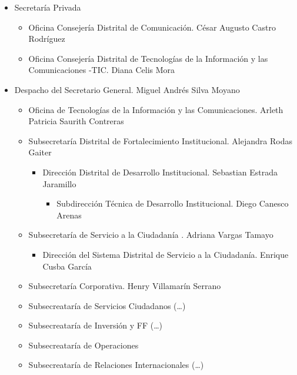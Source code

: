 \documentclass[
	a4paper, %
	12pt, %
]{include/CSSullivanBusinessReport}
\def\tightlist{}
\begin{document}
\begin{itemize}
\tightlist
\item
  Secretaría Privada

  \begin{itemize}
  \tightlist
  \item
    Oficina Consejería Distrital de Comunicación. César Augusto Castro
    Rodríguez
  \item
    Oficina Consejería Distrital de Tecnologías de la Información y las
    Comunicaciones -TIC. Diana Celis Mora
  \end{itemize}
\item
  Despacho del Secretario General. Miguel Andrés Silva Moyano

  \begin{itemize}
  \tightlist
  \item
    Oficina de Tecnologías de la Información y las Comunicaciones.
    Arleth Patricia Saurith Contreras
  \item
    Subsecretaría Distrital de Fortalecimiento Institucional. Alejandra
    Rodas Gaiter

    \begin{itemize}
    \tightlist
    \item
      Dirección Distrital de Desarrollo Institucional. Sebastian Estrada
      Jaramillo

      \begin{itemize}
      \tightlist
      \item
        Subdirección Técnica de Desarrollo Institucional. Diego Canesco
        Arenas
      \end{itemize}
    \end{itemize}
  \item
    Subsecretaría de Servicio a la Ciudadanía . Adriana Vargas Tamayo

    \begin{itemize}
    \tightlist
    \item
      Dirección del Sistema Distrital de Servicio a la Ciudadanía.
      Enrique Cusba García
    \end{itemize}
  \item
    Subsecretaría Corporativa. Henry Villamarín Serrano
  \item
    Subsecreataría de Servicios Ciudadanos (\ldots)
  \item
    Subsecreataría de Inversión y FF (\ldots)
  \item
    Subsecreataría de Operaciones
  \item
    Subsecreataría de Relaciones Internacionales (\ldots)
  \end{itemize}
\end{itemize}
\end{document}
